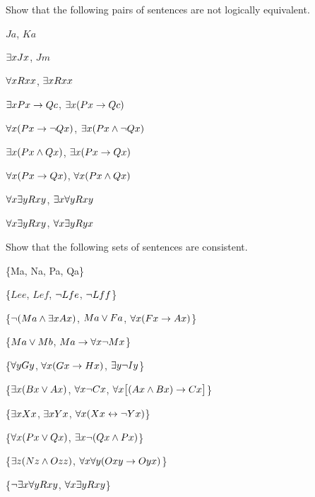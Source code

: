 \solutions
\problempart
\label{pr.NotEquiv}
Show that the following pairs of sentences are not logically equivalent.
\begin{earg}
\item $Ja$, $Ka$
\item $\exists x Jx$, $Jm$
\item $\forall x Rxx$, $\exists x Rxx$
\item $\exists x Px \rightarrow Qc$, $\exists x (Px \rightarrow Qc)$
\item $\forall x(Px \rightarrow \neg Qx)$, $\exists x(Px \wedge \neg Qx)$
\item $\exists x(Px \wedge Qx)$, $\exists x(Px \rightarrow Qx)$
\item $\forall x(Px\rightarrow Qx)$, $\forall x(Px \wedge Qx)$
\item $\forall x\exists y Rxy$, $\exists x\forall y Rxy$
\item $\forall x\exists y Rxy$, $\forall x\exists y Ryx$
\end{earg}



\problempart
Show that the following sets of sentences are consistent.
\begin{earg}
\item \{Ma, \enot Na, Pa, \enot Qa\}
\item \{$Lee$, $Lef$, $\neg Lfe$, $\neg Lff$\}
\item \{$\neg (Ma \wedge \exists x Ax)$, $Ma \vee Fa$, $\forall x(Fx \rightarrow Ax)$\}
\item \{$Ma \vee Mb$, $Ma \rightarrow \forall x \neg Mx$\}
\item \{$\forall y Gy$, $\forall x (Gx \rightarrow Hx)$, $\exists y \neg Iy$\}
\item \{$\exists x(Bx \vee Ax)$, $\forall x \neg Cx$, $\forall x\bigl[(Ax \wedge Bx) \rightarrow Cx\bigr]$\}
\item \{$\exists x Xx$, $\exists x Yx$, $\forall x(Xx \leftrightarrow \neg Yx)$\}
\item \{$\forall x(Px \vee Qx)$, $\exists x\neg(Qx \wedge Px)$\}
\item \{$\exists z(Nz \wedge Ozz)$, $\forall x\forall y(Oxy \rightarrow Oyx)$\}
\item \{$\neg \exists x \forall y Rxy$, $\forall x \exists y Rxy$\}
\end{earg}


